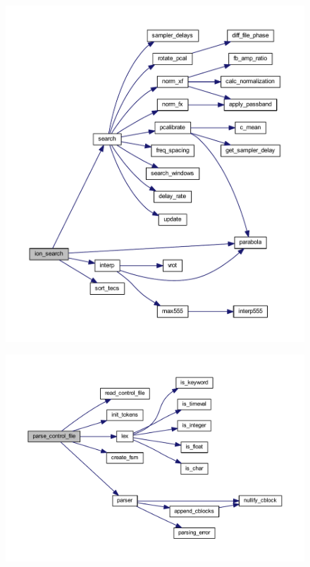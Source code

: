 \begin{figure}[tb]
  \centering
  \includegraphics[width=.9\linewidth]{./ion_search_graph.pdf}
  \label{fig:ionsearchgraph}
\end{figure}

\begin{figure}[tb]
  \centering
  \includegraphics[width=.9\linewidth]{./parse_control_file_graph.pdf}
  \label{fig:parsecfgraph}
\end{figure}


